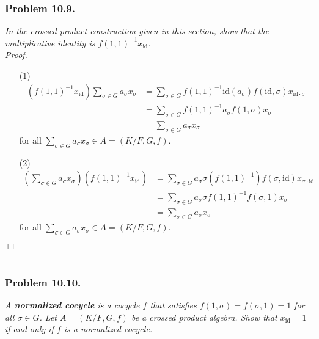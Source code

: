 \documentclass{article}
\begin{document}



\subsubsection*{Problem 10.9.}
\emph{In the crossed product construction given in this section,
show that the multiplicative identity is $f(1,1)^{-1}x_{\mathrm{id}}$.} \\



\emph{Proof.}
\begin{enumerate}
\item[(1)]
  \begin{align*}
    (f(1,1)^{-1}x_{\mathrm{id}}) \sum_{\sigma \in G} a_{\sigma} x_{\sigma}
    &= \sum_{\sigma \in G} f(1,1)^{-1} \mathrm{id}(a_{\sigma}) f(\mathrm{id}, \sigma)
        x_{\mathrm{id} \cdot \sigma} \\
    &= \sum_{\sigma \in G} f(1,1)^{-1} a_{\sigma} f(1, \sigma) x_{\sigma} \\
    &= \sum_{\sigma \in G} a_{\sigma} x_{\sigma}
  \end{align*}
  for all $\sum_{\sigma \in G} a_{\sigma} x_{\sigma} \in A = (K/F,G,f)$.

\item[(2)]
  \begin{align*}
    \left( \sum_{\sigma \in G} a_{\sigma} x_{\sigma} \right)(f(1,1)^{-1}x_{\mathrm{id}})
    &= \sum_{\sigma \in G} a_{\sigma} \sigma(f(1,1)^{-1}) f(\sigma, \mathrm{id})
        x_{\sigma \cdot \mathrm{id}} \\
    &= \sum_{\sigma \in G} a_{\sigma} \sigma f(1,1)^{-1} f(\sigma, 1)
        x_{\sigma} \\
    &= \sum_{\sigma \in G} a_{\sigma} x_{\sigma}
  \end{align*}
  for all $\sum_{\sigma \in G} a_{\sigma} x_{\sigma} \in A = (K/F,G,f)$.
\end{enumerate}
$\Box$ \\\\






\subsubsection*{Problem 10.10.}
\emph{A \textbf{normalized cocycle} is a cocycle $f$ that satisfies
$f(1,\sigma) = f(\sigma,1) = 1$ for all $\sigma \in G$.
Let $A = (K/F,G,f)$ be a crossed product algebra.
Show that $x_{\mathrm{id}} = 1$ if and only if $f$ is a normalized cocycle.} \\
\end{document}
